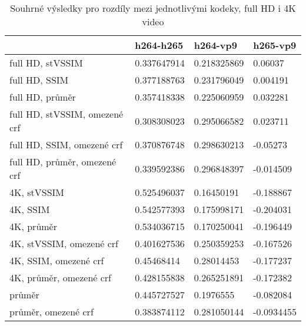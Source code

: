 \documentclass[thesis=M,czech]{FITthesis}[2016/06/26]
\begin{document}
\begin{table}[]
\centering
\begin{tabular}{|l|l|l|l|}
\hline
                     & h264-h265   & h264-vp9    & h265-vp9  \\ \hline
full HD, stVSSIM              & 0.337647914 & 0.218325869 & 0.06037   \\ \hline
full HD, SSIM                 & 0.377188763 & 0.231796049 & 0.004191  \\ \hline
full HD, průměr               & 0.357418338 & 0.225060959 & 0.032281  \\ \hline
full HD, stVSSIM, omezené crf & 0.308308023 & 0.295066582 & 0.023711  \\ \hline
full HD, SSIM, omezené crf    & 0.370876748 & 0.298630213 & -0.05273  \\ \hline
full HD, průměr, omezené crf  & 0.339592386 & 0.296848397 & -0.014509 \\ \hline
4K, stVSSIM              & 0.525496037 & 0.16450191  & -0.188867 \\ \hline
4K, SSIM                 & 0.542577393 & 0.175998171 & -0.204031 \\ \hline
4K, průměr               & 0.534036715 & 0.170250041 & -0.196449 \\ \hline
4K, stVSSIM, omezené crf & 0.401627536 & 0.250359253 & -0.167526 \\ \hline
4K, SSIM, omezené crf    & 0.45468414  & 0.28014453  & -0.177237 \\ \hline
4K, průměr, omezené crf  & 0.428155838 & 0.265251891 & -0.172382 \\ \hline
průměr            & 0.445727527 & 0.1976555   & -0.082084  \\ \hline
průměr, omezené crf               & 0.383874112 & 0.281050144 & -0.0934455 \\ \hline
\end{tabular}
\caption{Souhrné výsledky pro rozdíly mezi jednotlivými kodeky, full HD i 4K video}
\label{tab:results}
\end{table}
\end{document}
